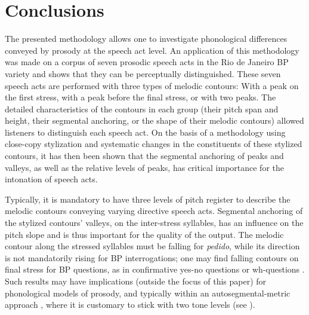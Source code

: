 \documentclass[output=paper]{LSP/langsci}
\begin{document}
\section{Conclusions}
\label{conclusions}
The presented methodology allows one to investigate phonological differences conveyed by prosody at the speech act level. 
An application of this methodology was made on a corpus of seven prosodic speech acts in the Rio de Janeiro BP variety and shows that they can be perceptually distinguished. 
These seven speech acts are performed with three types of melodic contours: With a peak on the first stress, with a peak before the final stress, or with two peaks. 
The detailed characteristics of the contours in each group (their pitch span and height, their segmental anchoring, or the shape of their melodic contours) allowed listeners to distinguish each speech act. 
On the basis of a methodology using close-copy stylization and systematic changes in the constituents of these stylized contours, it has then been shown that the segmental anchoring of peaks and valleys, as well as the relative levels of peaks, has critical importance for the intonation of speech acts.
\largerpage[-1]

Typically, it is mandatory to have three levels of pitch register to describe the melodic contours conveying varying directive speech acts. 
Segmental anchoring of the stylized contours' valleys, on the inter-stress syllables, has an influence on the pitch slope and is thus important for the quality of the output. 
The melodic contour along the stressed syllables must be falling for \textit{pedido}, while its direction is not mandatorily rising for BP interrogations; one may find falling contours on final stress for BP questions, as in confirmative yes-no questions or wh-questions \citep{moraes2008pitch}.
Such results may have implications (outside the focus of this paper) for phonological models of prosody, and typically within an autosegmental-metric approach \citep{Ladd2008}, where it is customary to stick with two tone levels (see \citealt{FacePrieto.2007,dimperio2010alignment}). 

{\sloppy
\printbibliography[heading=subbibliography,notkeyword=this]}
\end{document}
